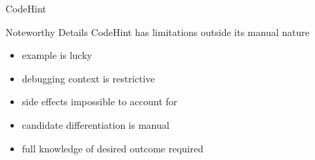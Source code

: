 \begin{frame}{CodeHint}
  \begin{block}{Noteworthy Details}
    CodeHint has limitations outside its manual nature

    \begin{itemize}
      \item example is lucky
      \item debugging context is restrictive
      \item side effects impossible to account for
      \item candidate differentiation is manual
      \item full knowledge of desired outcome required
    \end{itemize}
  \end{block}
\end{frame}

